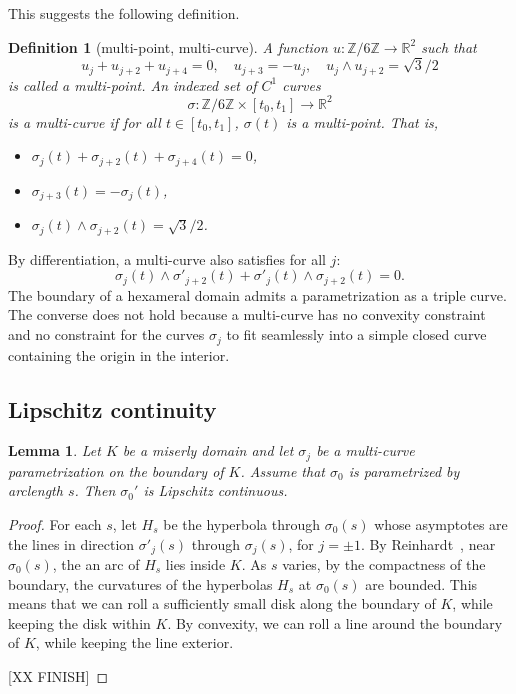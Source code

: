 \documentclass[11pt]{amsart}
\newtheorem{definition}{Definition}
\newtheorem{lemma}{Lemma}
\newcommand{\ring}[1]{\mathbb{#1}}
\def\rZ{{\ring{Z}}}
\begin{document}
This suggests the following definition.

\begin{definition}[multi-point, multi-curve]
A function $u:\rZ/6\rZ\to\ring{R}^2$ such that 
  \begin{equation}\label{eqn:uA}
  u_j+u_{j+2}+u_{j+4} = 0,\quad u_{j+3} = -u_j,\quad  {u_j}\land{u_{j+2}}=\sqrt{3}/2
  \end{equation}
is called a {\it multi-point}. 
An indexed set of $C^1$ curves
$$\sigma:\ring{Z}/6\ring{Z} \times [t_0,t_1]\to \ring{R}^2$$ 
is a {\it  multi-curve} if for all $t\in[t_0,t_1]$, $\sigma(t)$ is a multi-point.
That is,
\begin{itemize}
\item $\sigma_j(t) + \sigma_{j+2}(t) + \sigma_{j+4}(t) = 0$,
\item $\sigma_{j+3}(t) = -\sigma_j(t)$,
\item ${\sigma_j(t)}\land{\sigma_{j+2}(t)}=\sqrt{3}/2$.
\end{itemize}
\end{definition}



By differentiation, a multi-curve also satisfies for all $j$:
\begin{equation}\label{eqn:sigma'}
{\sigma_j(t)}\land{\sigma'_{j+2}(t)} 
+ {\sigma'_j(t)}\land{\sigma_{j+2}(t)} = 0.
\end{equation}
The boundary of a hexameral domain admits a parametrization as a triple
curve.  The converse does not hold because a multi-curve has no convexity
constraint and no constraint for the curves $\sigma_j$ to fit
seamlessly into a simple closed curve containing the origin in the interior.


\subsection{Lipschitz continuity}

\begin{lemma}
Let $K$ be a miserly domain and let $\sigma_j$ be a multi-curve parametrization on the boundary of $K$.  Assume that $\sigma_0$ is parametrized by arclength $s$.  Then $\sigma_0'$ is Lipschitz continuous.
\end{lemma}

\begin{proof} For each $s$, let $H_s$ be the
hyperbola through $\sigma_0(s)$ whose asymptotes are the lines in direction $\sigma'_j(s)$ through $\sigma_j(s)$, for $j=\pm 1$.  By Reinhardt~\cite{R}, near $\sigma_0(s)$, the an arc of $H_s$ lies
inside $K$.  As $s$ varies, by the compactness of the boundary, the curvatures of the hyperbolas $H_s$ at $\sigma_0(s)$ are bounded.  This means that
we can roll a sufficiently small disk along the boundary of $K$, while
keeping the disk within $K$.  By convexity, we can roll a line
around the boundary of $K$, while keeping the line exterior.

[XX FINISH]
\end{proof}
\end{document}
